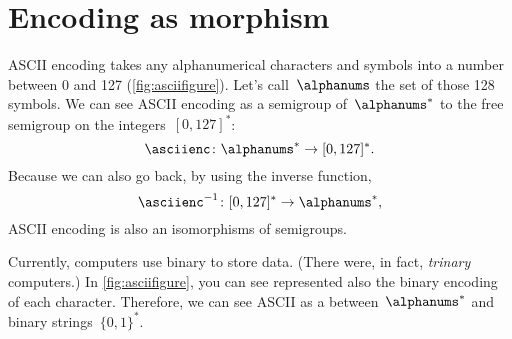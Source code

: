 \section{Encoding as morphism }
\begin{example}
    ASCII encoding takes any alphanumerical characters and symbols into a number between 0 and 127 (\cref{fig:asciifigure}).
    Let's call~$\alphanums$ the set of those 128 symbols.
    We can see ASCII encoding as a semigroup \whomo of~$\alphanums^*$ to the free semigroup on the integers~$[0,127]^*$:
    \begin{equation*}
        \label{eq:ASCII-semi}
        \asciienc\colon \alphanums^* \to  [0,127]^*.
    \end{equation*}
    Because we can also go back, by using the inverse function,
    \begin{equation*}
        \label{eq:ASCII-semi-inv}
        \asciienc^{-1}\colon  [0,127]^*  \to  \alphanums^*,
    \end{equation*}
    ASCII encoding is also an isomorphisms of semigroups.
\end{example}

\begin{example}
    Currently, computers use binary to store data. (There were, in fact, \emph{trinary} computers.)
    In \cref{fig:asciifigure}, you can see represented also the binary encoding of each character.
    Therefore, we can see ASCII as a \whomo between~$\alphanums^*$ and binary strings~$\{0,1\}^*$.
\end{example}

